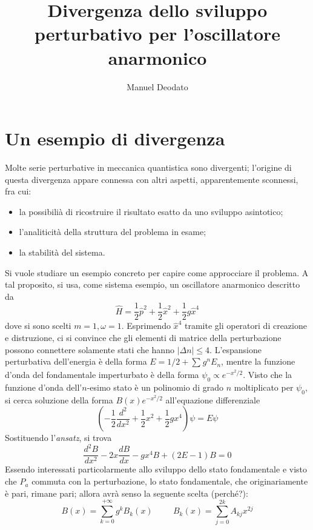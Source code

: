 \documentclass[11pt, a4paper]{scrartcl} %
\title{Divergenza dello sviluppo perturbativo per l'oscillatore anarmonico}
\author{Manuel Deodato}
\date{}
\renewcommand{\maketitle}{
\begin{center}
{\sffamily
{\fontsize{20}{20}\selectfont\MakeUppercase\thetitle}}

\vspace{0.2in}

{\large\scshape\sffamily\theauthor}
\end{center}
}
\numberwithin{equation}{section}
\theoremstyle{style2}
\theoremstyle{style1}
\begin{document}
\maketitle
\newpage
\tableofcontents
\newpage
\section{Un esempio di divergenza}
Molte serie perturbative in meccanica quantistica sono divergenti; l'origine di questa divergenza appare connessa con altri aspetti, apparentemente sconnessi, fra cui:
\begin{itemize}
	\item la possibili\`a di ricostruire il risultato esatto da uno sviluppo asintotico;
	\item l'analiticit\`a della struttura del problema in esame;
	\item la stabilit\`a del sistema.
\end{itemize}
Si vuole studiare un esempio concreto per capire come approcciare il problema.
A tal proposito, si usa, come sistema esempio, un oscillatore anarmonico descritto da
\begin{equation}
	\hat{H} = \frac{1}{2}\hat{p}^2 + \frac{1}{2}\hat{x}^2 + \frac{1}{2}g\hat{x}^4
\end{equation}
dove si sono scelti $m=1,\omega =1$.
Esprimendo $\hat{x}^4$ tramite gli operatori di creazione e distruzione, ci si convince che gli elementi di matrice della perturbazione possono connettere solamente stati che hanno $|\Delta  n| \le 4$.
L'espansione perturbativa dell'energia \`e della forma $E = 1/2 + \sum_{}^{} g^n E_n$, mentre la funzione d'onda del fondamentale imperturbato \`e della forma $\psi _0 \propto e^{-  x^2 / 2} $.
Visto che la funzione d'onda dell'$n$-esimo stato \`e un polinomio di grado $n$ moltiplicato per $\psi _0$, si cerca soluzione della forma $B(x) e^{-x^2 / 2} $ all'equazione differenziale
\begin{equation}
\left(	-\frac{1}{2} \frac{d ^2}{d x^2}  + \frac{1}{2}x^2  +\frac{1}{2}gx^4  \right) \psi  = E \psi 
\end{equation}
Sostituendo l'\textit{ansatz}, si trova
\[
\frac{d ^2B}{d x^2} - 2x \frac{d B}{d x}  - gx^4 B + (2E - 1) B = 0
\] 
Essendo interessati particolarmente allo sviluppo dello stato fondamentale e visto che $\hat{P}_a$ commuta con la perturbazione, lo stato fondamentale, che originariamente \`e pari, rimane pari; allora avr\`a senso la seguente scelta ({\color{red}perch\'e?}): 
\[
B(x) = \sum_{k=0}^{+\infty} g^k B_k(x) \hspace{1cm} B_k(x) = \sum_{j=0}^{2k} A_{kj} x^{2j} 
\] 
\end{document}
